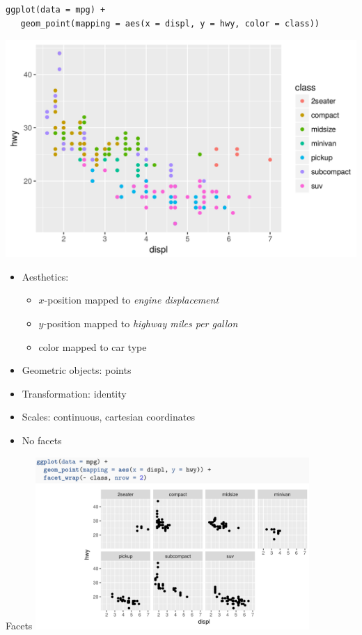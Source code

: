 \documentclass[xcolor=table,aspectratio=169]{beamer}
\begin{document}
\begin{frame}[fragile]

  \begin{footnotesize}
\begin{verbatim}
ggplot(data = mpg) +
   geom_point(mapping = aes(x = displ, y = hwy, color = class))
\end{verbatim}
  \end{footnotesize}
  \includegraphics[width=.3\textwidth]{pics/hadley-simpleplot.png}


  \begin{itemize}
  \item Aesthetics:
    \begin{itemize}
    \item     $x$-position mapped to \emph{engine displacement}
    \item   $y$-position mapped to \emph{highway miles per gallon}
      \item color mapped to car type
    \end{itemize}
  \item Geometric objects: points
    \item Transformation: identity 
  \item Scales: continuous, cartesian coordinates
    \item No facets
  \end{itemize}

\end{frame}

\begin{frame}{Facets}
  \includegraphics[width=0.78\textwidth]{pics/hadley-facet.png}
\end{frame}
\end{document}
